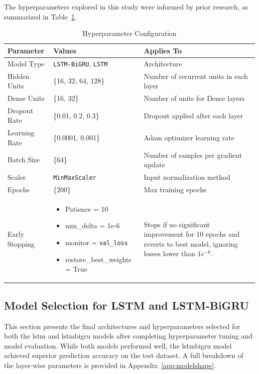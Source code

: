 The hyperparameters explored in this study were informed by prior research, as
summarized in Table~\ref{tab:grid-search-hparams}.

\begin{table}[H]
\centering
\caption{Hyperparameter Configuration}
\label{tab:grid-search-hparams}
\begin{tabular}{lp{4.5cm}p{6cm}}
\hline
\textbf{Parameter} & \textbf{Values} & \textbf{Applies To} \\
\hline\hline
Model Type & \texttt{LSTM-BiGRU}, \texttt{LSTM} & Architecture \\
Hidden Units & \{16, 32, 64, 128\} & Number of recurrent units in each layer \\
Dense Units & \{16, 32\} & Number of units for Dense layers \\
Dropout Rate & \{0.01, 0.2, 0.3\} & Dropout applied after each layer \\
Learning Rate & \{0.0001, 0.001\} & Adam optimizer learning rate \\
Batch Size & \{64\} & Number of samples per gradient update \\
Scaler & \texttt{MinMaxScaler}& Input normalization method \\
Epochs & \{200\} & Max training epochs \\
Early Stopping & \begin{itemize}
    \item Patience = 10
    \item min\_delta = 1e-6
    \item monitor = \texttt{val\_loss}
    \item restore\_best\_weights = True
\end{itemize}  & Stops 
if no significant improvement for 10 epochs and reverts to best model, ignoring losses lower than $1e^{-6}$. \\
\hline
\end{tabular}
\end{table}

\subsection{Model Selection for LSTM and LSTM-BiGRU}

This section presents the final architectures and hyperparameters selected for both the 
\acrshort{lstm} and \acrshort{lstmbigru} models after completing hyperparameter tuning 
and model evaluation. While both models performed well, the \acrshort{lstmbigru} model 
achieved superior prediction accuracy on the test dataset. A full breakdown of the layer-wise 
parameters is provided in Appendix~\ref{app:modelshape}.

